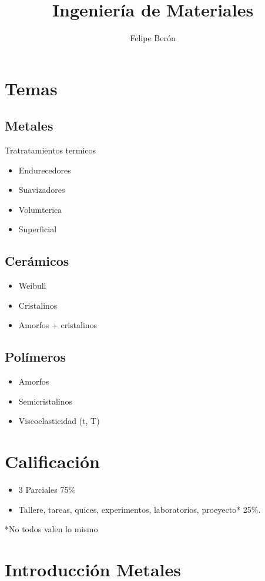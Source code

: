 \documentclass {article}
\author{Felipe Berón}
\title{Ingeniería de Materiales}
\begin{document}
\maketitle
\section*{Temas}
\subsection*{Metales}
Tratratamientos termicos
\begin{itemize}
 \item Endurecedores
 \item Suavizadores
 \item Volumterica
 \item Superficial
\end{itemize}
\subsection*{Cerámicos}
\begin{itemize}
 \item Weibull
 \item Cristalinos
 \item Amorfos + cristalinos
\end{itemize}
\subsection*{Polímeros}
\begin{itemize}
 \item Amorfos
 \item Semicristalinos
 \item Viscoelasticidad (t, T)
\end{itemize}
\section*{Calificación}
\begin{itemize}
 \item3 Parciales 75$\%$
 \item Tallere, tareas, quices, experimentos, laboratorios, proeyecto* 25$\%$.
\end{itemize}
*No todos valen lo mismo
\section*{Introducción Metales}
\end{document}
